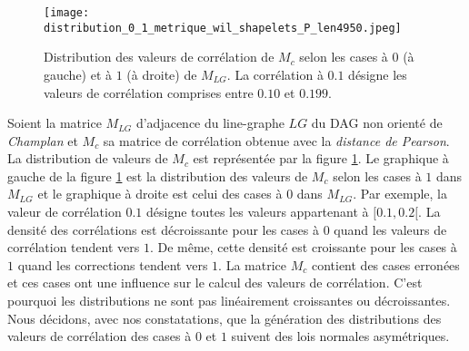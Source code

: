 \begin{figure}[htb!] 
\centering
\texttt{[image: distribution\_0\_1\_metrique\_wil\_shapelets\_P\_len4950.jpeg]}
\caption{ Distribution des valeurs de corr\'elation de $M_c$ selon les cases \`a $0$ (\`a gauche) et \`a $1$ (\`a droite) de $M_{LG}$. La corr\'elation \`a $0.1$ d\'esigne  les valeurs de corr\'elation comprises entre $0.10$ et $0.199$. }
\label{distribution_0_1_metrique_wil_shapelets_P_len4950} 
\end{figure}


Soient la matrice $M_{LG}$ d'adjacence du line-graphe $LG$ du DAG non orient\'e de {\em Champlan} et $M_c$ sa matrice de corr\'elation obtenue avec la {\em distance de Pearson}.
 La distribution de valeurs de $M_c$ est repr\'esent\'ee par la figure \ref{distribution_0_1_metrique_wil_shapelets_P_len4950}. Le graphique \`a gauche de la figure \ref{distribution_0_1_metrique_wil_shapelets_P_len4950}  est la distribution des valeurs de $M_c$ selon les cases \`a $1$ dans $M_{LG}$ et le graphique \`a droite est celui des cases \`a $0$ dans $M_{LG}$. 
 Par exemple, la valeur de corr\'elation $0.1$ d\'esigne toutes les valeurs appartenant \`a $[0.1, 0.2[$. 
\newline
La densit\'e des  corr\'elations est d\'ecroissante pour les cases \`a $0$ quand les valeurs de corr\'elation tendent vers $1$. De m\^eme, cette densit\'e est croissante pour les cases \`a $1$ quand les corrections tendent vers $1$. La matrice $M_c$ contient des cases erron\'ees et ces cases ont une influence sur le calcul des valeurs de corr\'elation. C'est pourquoi les distributions ne sont pas lin\'eairement croissantes ou d\'ecroissantes.
Nous d\'ecidons, avec nos constatations, que la g\'en\'eration des distributions des valeurs de corr\'elation des cases \`a $0$ et $1$ suivent des lois normales asym\'etriques.
\newline

